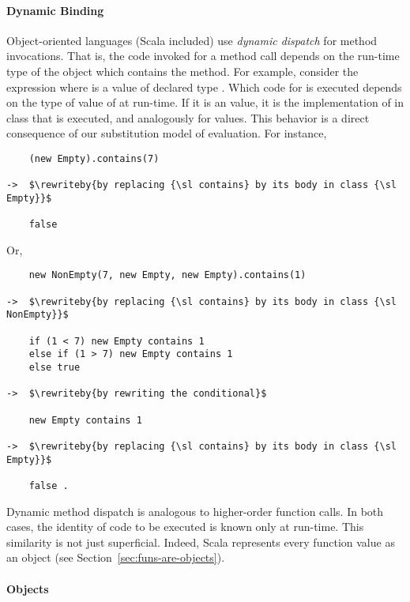 \documentclass[a4paper,12pt,twoside,titlepage]{book}
\newcommand{\rewriteby}[1]{\mbox{\tab\tab\rm(#1)}}
\begin{document}
\paragraph{Dynamic Binding}

Object-oriented languages (Scala included) use \emph{dynamic dispatch}
for method invocations.  That is, the code invoked for a method call
depends on the run-time type of the object which contains the method.
For example, consider the expression  where
 is a value of declared type . Which code for
 is executed depends on the type of value of  at run-time.
If it is an  value, it is the implementation of  in class  that is executed, and analogously for  values. 
This behavior is a direct consequence of our substitution model of evaluation.
For instance,
\begin{lstlisting}
    (new Empty).contains(7) 

->  $\rewriteby{by replacing {\sl contains} by its body in class {\sl Empty}}$

    false
\end{lstlisting}
Or,
\begin{lstlisting}
    new NonEmpty(7, new Empty, new Empty).contains(1)

->  $\rewriteby{by replacing {\sl contains} by its body in class {\sl NonEmpty}}$

    if (1 < 7) new Empty contains 1
    else if (1 > 7) new Empty contains 1
    else true

->  $\rewriteby{by rewriting the conditional}$

    new Empty contains 1

->  $\rewriteby{by replacing {\sl contains} by its body in class {\sl Empty}}$

    false .
\end{lstlisting}

Dynamic method dispatch is analogous to higher-order function
calls. In both cases, the identity of code to be executed is known
only at run-time. This similarity is not just superficial. Indeed,
Scala represents every function value as an object (see
Section~\ref{sec:funs-are-objects}).


\paragraph{Objects}
\end{document}
